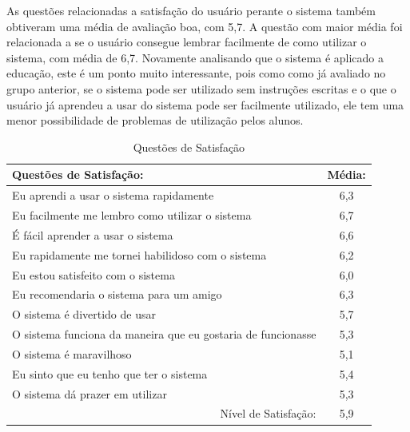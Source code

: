 As questões relacionadas a satisfação do usuário perante o sistema também obtiveram uma média de avaliação boa, com 5,7. A questão com maior média foi relacionada a se o usuário consegue lembrar facilmente de como utilizar o sistema, com média de 6,7. Novamente analisando que o sistema é aplicado a educação, este é um ponto muito interessante, pois como como já avaliado no grupo anterior, se o sistema pode ser utilizado sem instruções escritas e o que o usuário já aprendeu a usar do sistema pode ser facilmente utilizado, ele tem uma menor possibilidade de problemas de utilização pelos alunos.

\begin{table}[]
\centering
\caption{Questões de Satisfação}
\label{tab:use_utilidade}
\begin{tabular}{@{}|l|c|@{}}
\hline
Questões de Satisfação:                                                   & \multicolumn{1}{l|}{Média:} \\ \hline
Eu aprendi a usar o sistema rapidamente                                    & 6,3                         \\ \hline
Eu facilmente me lembro como utilizar o sistema                                  & 6,7                         \\ \hline
É fácil aprender a usar o sistema                                                         & 6,6                            \\ \hline
Eu rapidamente me tornei habilidoso com o sistema                   & 6,2                            \\ \hline
Eu estou satisfeito com o sistema & 6,0                            \\ \hline
Eu recomendaria o sistema para um amigo                                & 6,3                            \\ \hline
O sistema é divertido de usar                       &5,7                             \\ \hline
O sistema funciona da maneira que eu gostaria de funcionasse                       &5,3                             \\ \hline
O sistema é maravilhoso                       &5,1                             \\ \hline
Eu sinto que eu tenho que ter o sistema                       &5,4                             \\ \hline
O sistema dá prazer em utilizar                       &5,3                             \\ \hline
\multicolumn{1}{|r|}{Nível de Satisfação:}                                & 5,9      \\ \hline
\end{tabular}
\end{table}


